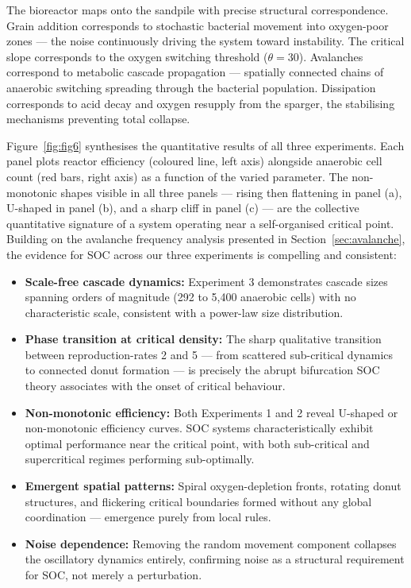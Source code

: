 \documentclass[12pt]{article}
\begin{document}
The bioreactor maps onto the sandpile with precise structural correspondence. Grain addition corresponds to stochastic bacterial movement into oxygen-poor zones --- the noise continuously driving the system toward instability. The critical slope corresponds to the oxygen switching threshold ($\theta = 30$). Avalanches correspond to metabolic cascade propagation --- spatially connected chains of anaerobic switching spreading through the bacterial population. Dissipation corresponds to acid decay and oxygen resupply from the sparger, the stabilising mechanisms preventing total collapse.

Figure~\ref{fig:fig6} synthesises the quantitative results of all three
experiments. Each panel plots reactor efficiency (coloured line, left axis)
alongside anaerobic cell count (red bars, right axis) as a function of the
varied parameter. The non-monotonic shapes visible in all three panels ---
rising then flattening in panel (a), U-shaped in panel (b), and a sharp cliff
in panel (c) --- are the collective quantitative signature of a system operating
near a self-organised critical point. Building on the avalanche frequency analysis presented in Section~\ref{sec:avalanche},
the evidence for SOC across our three experiments is compelling and consistent:
\begin{itemize}[leftmargin=1.5em]
  \item \textbf{Scale-free cascade dynamics:} Experiment 3 demonstrates cascade sizes spanning orders of magnitude (292 to 5,400 anaerobic cells) with no characteristic scale, consistent with a power-law size distribution.

  \item \textbf{Phase transition at critical density:} The sharp qualitative transition between reproduction-rates 2 and 5 --- from scattered sub-critical dynamics to connected donut formation --- is precisely the abrupt bifurcation SOC theory associates with the onset of critical behaviour.

  \item \textbf{Non-monotonic efficiency:} Both Experiments 1 and 2 reveal U-shaped or non-monotonic efficiency curves. SOC systems characteristically exhibit optimal performance near the critical point, with both sub-critical and supercritical regimes performing sub-optimally.

  \item \textbf{Emergent spatial patterns:} Spiral oxygen-depletion fronts, rotating donut structures, and flickering critical boundaries formed without any global coordination --- emergence purely from local rules.

  \item \textbf{Noise dependence:} Removing the random movement component collapses the oscillatory dynamics entirely, confirming noise as a structural requirement for SOC, not merely a perturbation.
\end{itemize}
\end{document}
